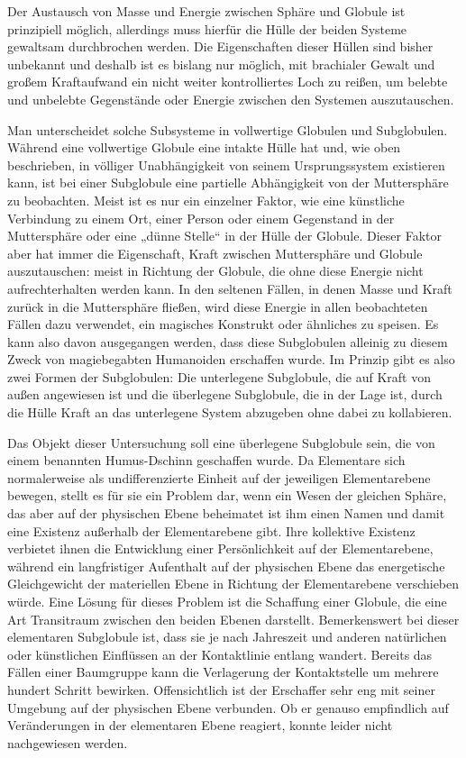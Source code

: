 \documentclass[a5paper,8pt]{book}
\begin{document}
Der Austausch von Masse und Energie zwischen Sphäre und Globule ist prinzipiell möglich, allerdings muss hierfür die Hülle 
der beiden Systeme gewaltsam durchbrochen werden. Die Eigenschaften dieser Hüllen sind bisher unbekannt und deshalb ist es 
bislang nur möglich, mit brachialer Gewalt und großem Kraftaufwand ein nicht weiter kontrolliertes Loch zu reißen, um 
belebte und unbelebte Gegenstände oder Energie zwischen den Systemen auszutauschen.

Man unterscheidet solche Subsysteme in vollwertige Globulen und Subglobulen. Während eine vollwertige Globule eine intakte 
Hülle hat und, wie oben beschrieben, in völliger Unabhängigkeit von seinem Ursprungssystem existieren kann, ist bei einer 
Subglobule eine partielle Abhängigkeit von der Muttersphäre zu beobachten. Meist ist es nur ein einzelner Faktor, wie eine 
künstliche Verbindung zu einem Ort, einer Person oder einem Gegenstand in der Muttersphäre oder eine „dünne Stelle“ in der 
Hülle der Globule. Dieser Faktor aber hat immer die Eigenschaft, Kraft zwischen Muttersphäre und Globule auszutauschen: 
meist in Richtung der Globule, die ohne diese Energie nicht aufrechterhalten werden kann. 
In den seltenen Fällen, in denen Masse und Kraft zurück in die Muttersphäre fließen, wird diese Energie in allen 
beobachteten Fällen dazu verwendet, ein magisches Konstrukt oder ähnliches zu speisen. Es kann also davon ausgegangen 
werden, dass diese Subglobulen alleinig zu diesem Zweck von magiebegabten Humanoiden erschaffen wurde. 
Im Prinzip gibt es also zwei Formen der Subglobulen: Die unterlegene Subglobule, die auf Kraft von außen angewiesen ist und 
die überlegene Subglobule, die in der Lage ist, durch die Hülle Kraft an das unterlegene System abzugeben ohne dabei zu 
kollabieren.

Das Objekt dieser Untersuchung soll eine überlegene Subglobule sein, die von einem benannten Humus-Dschinn geschaffen 
wurde. Da Elementare sich normalerweise als undifferenzierte Einheit auf der jeweiligen Elementarebene bewegen, stellt es 
für sie ein Problem dar, wenn ein Wesen der gleichen Sphäre, das aber auf der physischen Ebene beheimatet ist ihm einen 
Namen und damit eine Existenz außerhalb der Elementarebene gibt. Ihre kollektive Existenz verbietet ihnen die Entwicklung 
einer Persönlichkeit auf der Elementarebene, während ein langfristiger Aufenthalt auf der physischen Ebene das energetische 
Gleichgewicht der materiellen Ebene in Richtung der Elementarebene verschieben würde. Eine Lösung für dieses Problem ist 
die Schaffung einer Globule, die eine Art Transitraum zwischen den beiden Ebenen darstellt. 
Bemerkenswert bei dieser elementaren Subglobule ist, dass sie je nach Jahreszeit und anderen natürlichen oder künstlichen 
Einflüssen an der Kontaktlinie entlang wandert. Bereits das Fällen einer Baumgruppe kann die Verlagerung der Kontaktstelle 
um mehrere hundert Schritt bewirken. Offensichtlich ist der Erschaffer sehr eng mit seiner Umgebung auf der physischen 
Ebene verbunden. Ob er genauso empfindlich auf Veränderungen in der elementaren Ebene reagiert, konnte leider nicht 
nachgewiesen werden. 
\end{document}
